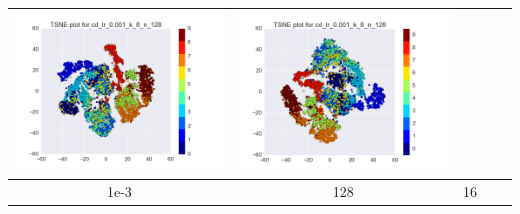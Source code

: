 \documentclass[12pt]{report}
\begin{document}
\begin{table}[H]
\begin{tabular}{ | c | c | c | c || c |}
\begin{minipage}{.3\textwidth}
      \includegraphics[scale=0.25]{cd_lr_0_001_k_8_n_128.png}
    \end{minipage} &
    \begin{minipage}{.3\textwidth}
      \includegraphics[scale=0.25]{test_cd_lr_0_001_k_8_n_128.png}
    \end{minipage}
        \\ \hline
    1e-3 & 128 & 16 &
    \begin{minipage}{.3\textwidth}

\end{minipage}
\end{tabular}
\end{table}
\end{document}
